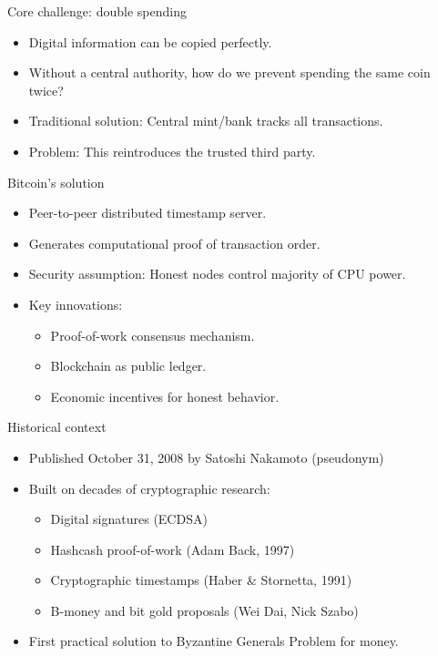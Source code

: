 \documentclass[aspectratio=169, lualatex, handout]{beamer}
\begin{document}
\begin{frame}{Core challenge: double spending}
	\begin{itemize}
		\item Digital information can be copied perfectly.
		\item Without a central authority, how do we prevent spending the same coin twice?
		\item Traditional solution: Central mint/bank tracks all transactions.
		\item Problem: This reintroduces the trusted third party.
	\end{itemize}
\end{frame}

\begin{frame}{Bitcoin's solution}
	\begin{itemize}
		\item Peer-to-peer distributed timestamp server.
		\item Generates computational proof of transaction order.
		\item Security assumption: Honest nodes control majority of CPU power.
		\item Key innovations:
		      \begin{itemize}
			      \item Proof-of-work consensus mechanism.
			      \item Blockchain as public ledger.
			      \item Economic incentives for honest behavior.
		      \end{itemize}
	\end{itemize}
\end{frame}

\begin{frame}{Historical context}
	\begin{itemize}
		\item Published October 31, 2008 by Satoshi Nakamoto (pseudonym)
		\item Built on decades of cryptographic research:
		      \begin{itemize}
			      \item Digital signatures (ECDSA)
			      \item Hashcash proof-of-work (Adam Back, 1997)
			      \item Cryptographic timestamps (Haber \& Stornetta, 1991)
			      \item B-money and bit gold proposals (Wei Dai, Nick Szabo)
		      \end{itemize}
		\item First practical solution to Byzantine Generals Problem for money.
	\end{itemize}
\end{frame}
\end{document}
